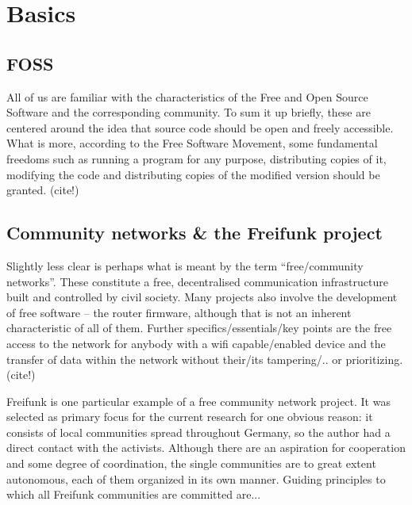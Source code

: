 \section{Basics}
\subsection{FOSS}
All of us are familiar with the characteristics of the Free and Open Source Software and the corresponding community.
To sum it up briefly, these are centered around the idea that source code should be open and freely accessible.
What is more, according to the Free Software Movement,
some fundamental freedoms such as running a program for any purpose, distributing copies of it, modifying the code and distributing copies of the modified version should be granted. (cite!)


\subsection{Community networks \& the Freifunk project}
Slightly less clear is perhaps what is meant by the term ``free/community networks''. %
These constitute a free, decentralised communication infrastructure built and controlled by civil society.
Many projects also involve the development of free software -- the router firmware, although that is not an inherent characteristic of all of them.
Further specifics/essentials/key points are the free access to the network for anybody with a wifi capable/enabled device and the transfer of data within the network without their/its tampering/.. or prioritizing. (cite!)

Freifunk is one particular example of a free community network project.
It was selected as primary focus for the current research for one obvious reason: it consists of local communities spread throughout Germany, so the author had a direct contact with the activists.
Although there are an aspiration for cooperation and some degree of coordination, the single communities are to great extent autonomous, each of them organized in its own manner.
Guiding principles to which all Freifunk communities are committed are...

